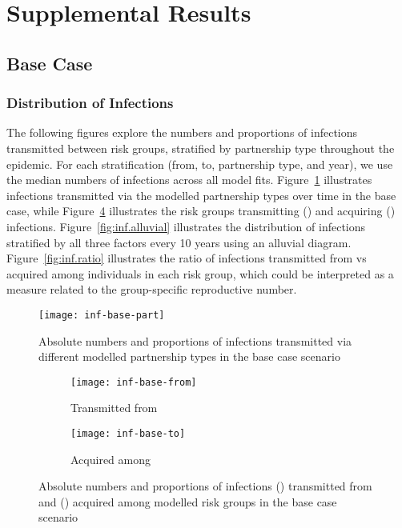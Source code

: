 \section{Supplemental Results}\label{a:res}
\subsection{Base Case}\label{a:res.bc}
\subsubsection{Distribution of Infections}\label{a:res.bc.inf}
The following figures explore the numbers and proportions of infections
transmitted between risk groups, stratified by partnership type throughout the epidemic.
For each stratification (from, to, partnership type, and year),
we use the median numbers of infections across all model fits.
Figure~\ref{fig:inf.part} illustrates
infections transmitted via the modelled partnership types over time in the base case, while
Figure~\ref{fig:inf.frto} illustrates
the risk groups transmitting () and acquiring () infections.
Figure~\ref{fig:inf.alluvial} illustrates the distribution of infections
stratified by all three factors every 10 years using an alluvial diagram.
Figure~\ref{fig:inf.ratio} illustrates
the ratio of infections transmitted from vs acquired among individuals in each risk group,
which could be interpreted as a measure related to the group-specific reproductive number.
\begin{figure}[h]
  \texttt{[image: inf-base-part]}
  \caption{Absolute numbers and proportions of infections
    transmitted via different modelled partnership types
    in the base case scenario}
  \label{fig:inf.part}
\end{figure}
\begin{figure}[h]
  \begin{subfigure}{\linewidth}
    \texttt{[image: inf-base-from]}
    \caption{Transmitted from}
    \label{fig:inf.fr}
  \end{subfigure}
  \begin{subfigure}{\linewidth}
    \texttt{[image: inf-base-to]}
    \caption{Acquired among}
    \label{fig:inf.to}
  \end{subfigure}
  \caption{Absolute numbers and proportions of infections
    () transmitted from and () acquired among modelled risk groups
    in the base case scenario}
  \label{fig:inf.frto}
\end{figure}
